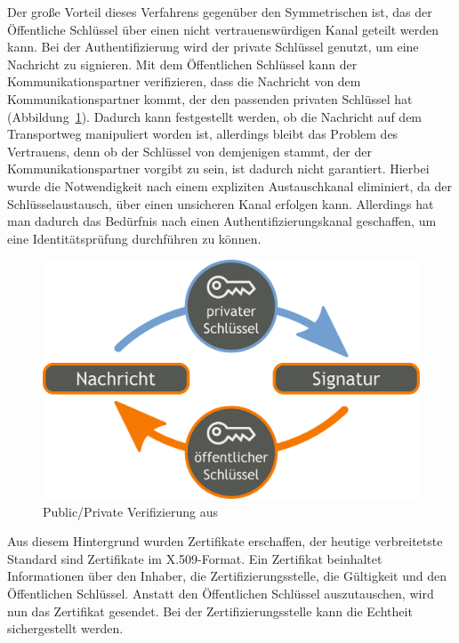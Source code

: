 \documentclass[11pt,a4paper]{report}
\begin{document}
Der große Vorteil dieses Verfahrens gegenüber den Symmetrischen ist, das der Öffentliche Schlüssel über einen nicht vertrauenswürdigen Kanal geteilt werden kann. Bei der Authentifizierung wird der private Schlüssel genutzt, um eine Nachricht zu signieren. Mit dem Öffentlichen Schlüssel kann der Kommunikationspartner verifizieren, dass die Nachricht von dem Kommunikationspartner kommt, der den passenden privaten Schlüssel hat (Abbildung~\ref{fig:pp_veri}). Dadurch kann festgestellt werden, ob die Nachricht auf dem Transportweg manipuliert worden ist, allerdings bleibt das Problem des Vertrauens, denn ob der Schlüssel von demjenigen stammt, der der Kommunikationspartner vorgibt zu sein, ist dadurch nicht garantiert. Hierbei wurde die Notwendigkeit nach einem expliziten Austauschkanal eliminiert, da der Schlüsselaustausch, über einen unsicheren Kanal erfolgen kann. Allerdings hat man dadurch das Bedürfnis nach einen Authentifizierungskanal geschaffen, um eine Identitätsprüfung durchführen zu können.
 
\begin{figure}[htbp]
\centering
\includegraphics[scale=0.2]{images/public_private_verification.pdf}
\caption{Public/Private Verifizierung aus \cite{wiki_asym_crypto}}
\label{fig:pp_veri}
\end{figure}

Aus diesem Hintergrund wurden Zertifikate erschaffen, der heutige verbreitetste Standard sind Zertifikate im X.509-Format. Ein Zertifikat beinhaltet Informationen über den Inhaber, die Zertifizierungsstelle, die Gültigkeit und den Öffentlichen Schlüssel. Anstatt den Öffentlichen Schlüssel auszutauschen, wird nun das Zertifikat gesendet. Bei der Zertifizierungsstelle kann die Echtheit sichergestellt werden. 
\end{document}
